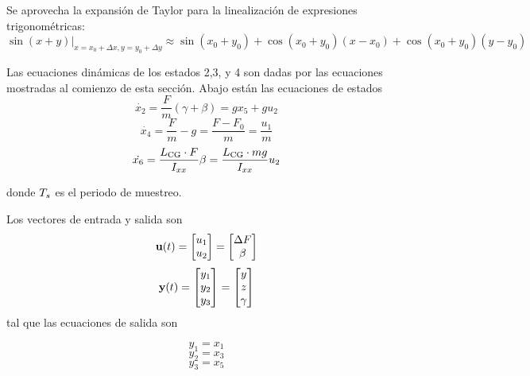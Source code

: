 Se aprovecha la expansión de Taylor para la linealización de expresiones trigonométricas:
\[
\sin(x+y)|_{x=x_0+\Delta x,y=y_0+\Delta y} \approx \sin(x_0+y_0) + \cos(x_0 + y_0) (x-x_0) + \cos(x_0 + y_0) (y-y_0)
\]

Las ecuaciones dinámicas de los estados 2,3, y 4 son dadas por las ecuaciones mostradas al comienzo de esta sección.
Abajo están las ecuaciones de estados
\begin{equation}
	\dot{x_2} = \frac{F}{m} \left( \gamma+\beta \right) = g x_5 + g u_2 
\end{equation}
\begin{equation}
\dot{x_4} = \frac{F}{m} - g =\frac{F-F_0}{m}= \frac{u_1}{m}
\end{equation}
\begin{equation}
\dot{x_6} = \frac{L_{\mathrm{CG}} \cdot F}{I_{xx}} \beta = \frac{L_{\mathrm{CG}} \cdot mg}{I_{xx}} u_2 
\end{equation}

donde $T_s$ es el periodo de muestreo.

Los vectores de entrada y salida son
\[
\mathbf{u}(t) = \begin{bmatrix}
u_1 \\
u_2
\end{bmatrix} = \begin{bmatrix}
\Delta F \\
\beta
\end{bmatrix}
\]
\[
\mathbf{y}(t) = \begin{bmatrix}
y_1 \\
y_2 \\
y_3
\end{bmatrix} = \begin{bmatrix}
y \\
z \\
\gamma
\end{bmatrix}
\]
tal que las ecuaciones de salida son

\begin{equation}
	y_1 = x_1 
\end{equation}
\begin{equation}
	y_2 = x_3
\end{equation}
\begin{equation}
	y_3 = x_5
\end{equation}

